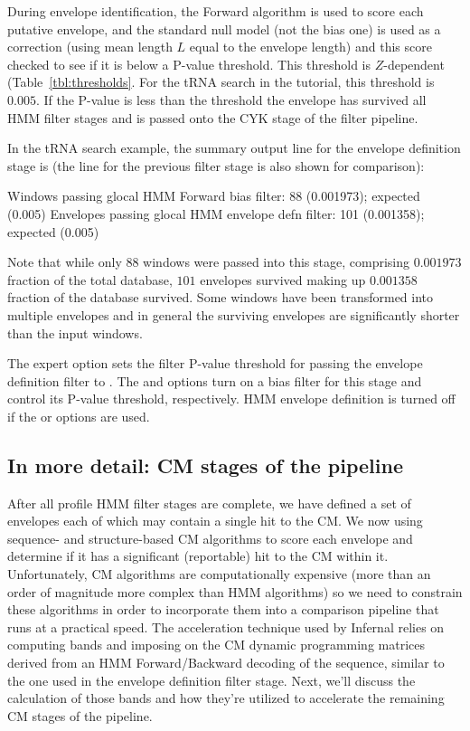 \begin{sreoutput}
During envelope identification, the Forward algorithm is used to score
each putative envelope, and the standard null model (not the bias one)
is used as a correction (using mean length $L$ equal to the envelope
length) and this score checked to see if it is below a P-value
threshold. This threshold is $Z$-dependent
(Table~\ref{tbl:thresholds}. For the tRNA search in the tutorial, this
threshold is $0.005$. If the P-value is less than the threshold the
envelope has survived all HMM filter stages and is passed onto the CYK
stage of the filter pipeline. 

In the tRNA search example, the summary output line for the envelope
definition stage is (the line for the previous filter stage is also
shown for comparison):

\begin{sreoutput}
Windows   passing glocal HMM Forward  bias filter:              88  (0.001973); expected (0.005)
Envelopes passing glocal HMM envelope defn filter:             101  (0.001358); expected (0.005)
\end{sreoutput}

Note that while only $88$ windows were passed into this stage,
comprising $0.001973$ fraction of the total database, $101$ envelopes
survived making up $0.001358$ fraction of the database survived. Some
windows have been transformed into multiple envelopes and in general
the surviving envelopes are significantly shorter than the input
windows. 

The  expert option sets the filter P-value threshold for
passing the envelope definition filter to . The  and
 options turn on a bias filter for this stage 
and control its P-value threshold, respectively. HMM envelope
definition is turned off if the  or 
options are used.

\subsection{In more detail: CM stages of the pipeline}

After all profile HMM filter stages are complete, we have defined a
set of envelopes each of which may contain a single hit to the CM. We
now using sequence- and structure-based CM algorithms to score each
envelope and determine if it has a significant (reportable) hit to the
CM within it. Unfortunately, CM algorithms are computationally
expensive (more than an order of magnitude more complex than HMM
algorithms) so we need to constrain these algorithms in order to
incorporate them into a comparison pipeline that runs at a practical
speed. The acceleration technique used by Infernal relies on computing
bands and imposing on the CM dynamic programming matrices derived from
an HMM Forward/Backward decoding of the sequence, similar to the one
used in the envelope definition filter stage. Next, we'll discuss the
calculation of those bands and how they're utilized to accelerate the
remaining CM stages of the pipeline. 


\end{sreoutput}
